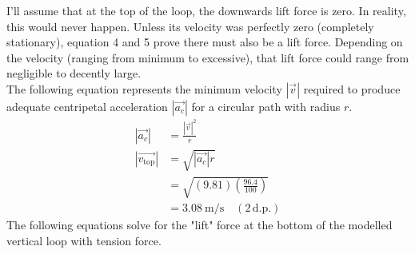 \documentclass[11pt, a4paper]{article}
\begin{document}
	I'll assume that at the top of the loop, the downwards lift force is zero. In reality, this would never happen. Unless its velocity was perfectly zero (completely stationary), equation 4 and 5 prove there must also be a lift force. Depending on the velocity (ranging from minimum to excessive), that lift force could range from negligible to decently large.\\
	The following equation represents the minimum velocity $|\vec{v}|$ required to produce adequate centripetal acceleration $|\vec{a_c}|$ for a circular path with radius $r$.
	\begin{align}
		|\vec{a_c}|&=\frac{|\vec{v}|^2}{r}\\
		|\vec{v_{\text{top}}}|&=\sqrt{|\vec{a_c}|r}\\
		&=\sqrt{(9.81)\left(\frac{96.4}{100}\right)}\\
		&= \SI{3.08}{\meter\per\second} \quad (2\, \text{d.p.})
	\end{align}
	The following equations solve for the "lift" force at the bottom of the modelled vertical loop with tension force.
\end{document}
